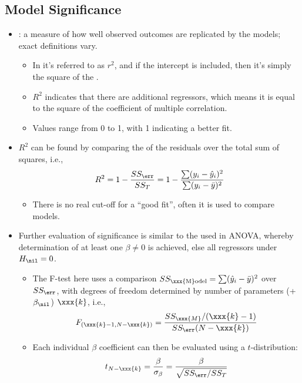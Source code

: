 \begin{itemize}
  \subsection{Model Significance}
  \begin{itemize}
    \item {}: a measure of how well observed outcomes are replicated by the models; exact definitions vary.
      \begin{itemize}
        \item In \hyperref[Subsection: Simple and Multiple Regression]{} it's referred to as \(r^2\), and if the intercept is included, then it's simply the square of the \hyperref[Subsection: Pearson Correlation]{}.
        \item \(R^2\) indicates that there are additional regressors, which means it is equal to the square of the coefficient of multiple correlation. 
        \item Values range from 0 to 1, with 1 indicating a better fit.
      \end{itemize}
    \item \(R^2\) can be found by comparing the \hyperref[Subsection: Sum of Squares]{} of the residuals over the total sum of squares, i.e.,
    \[%
    R^2 = 1 - \frac{SS_\err}{SS_T} = 1 - \frac{\sum(y_i - \hat{y}_i)^2}{\sum(y_i - \bar{y})^2}
    \]%
    \begin{itemize}
      \item There is no real cut-off for a ``good fit'', often it is used to compare models.
    \end{itemize}
  \item Further evaluation of significance is similar to the \hyperref[Subsection: F-Test]{} used in ANOVA, whereby determination of at least one \(\beta \neq 0\) is achieved, else all regressors under \(H_\nil = 0 \).
    \begin{itemize}
      \item The F-test here uses a comparison \(SS_{\text{\xxx{M}odel}} = \sum(\hat{y}_i-\bar{y})^2\) over \(SS_\err\), with degrees of freedom determined by number of parameters (+ \(\beta_\nil\)) \(\xxx{k}\), i.e.,
      \[%
      F_{(\xxx{k}-1,N-\xxx{k})} = \frac{SS_\xxx{M}/(\xxx{k}-1)}{SS_\err(N-\xxx{k})}
      \]%
      \item Each individual \(\beta \) coefficient can then be evaluated using a \(t\)-distribution:
      \[%
      t_{N-\xxx{k}} = \frac{\beta}{\sigma_\beta} = \frac{\beta}{\sqrt{SS_\err/SS_T}}
      \]%
      

\end{itemize}
\end{itemize}
\end{itemize}
